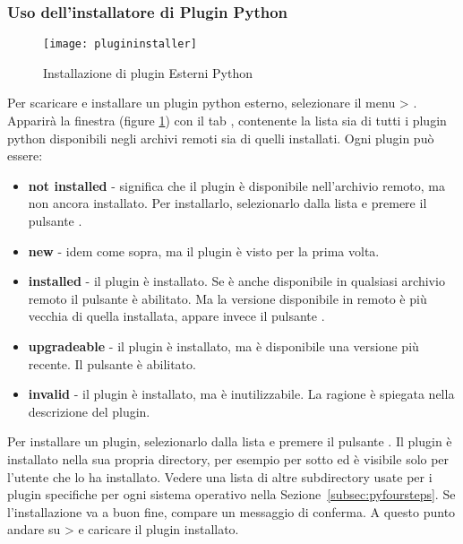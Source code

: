 \subsubsection{Uso dell'installatore di Plugin Python}\label{sec:python_plugin_installer}

\begin{figure}[ht]
   \begin{center}
   \caption{Installazione di plugin Esterni Python \nixcaption}
\label{fig:plugininstaller}\smallskip
   \texttt{[image: plugininstaller]}
\end{center}
\end{figure}

Per scaricare e installare un plugin python esterno, selezionare il menu  > .
Apparirà la finestra   (figure \ref{fig:plugininstaller}) con il tab , contenente la lista sia di tutti i plugin python disponibili negli archivi remoti sia di quelli installati. Ogni plugin può essere:
\begin{itemize}
\item \textbf{not installed} - significa che il plugin è disponibile nell'archivio remoto, ma non ancora installato. Per installarlo, selezionarlo dalla lista e premere il pulsante  .
\item \textbf{new} - idem come sopra, ma il plugin è visto per la prima volta.
\item \textbf{installed} - il plugin è installato. Se è anche disponibile in qualsiasi archivio remoto il pulsante  è abilitato. Ma la versione disponibile in remoto è più vecchia di quella installata, appare invece il pulsante .
\item \textbf{upgradeable} - il plugin è installato, ma è disponibile una versione più recente. Il pulsante  è abilitato.
\item \textbf{invalid} - il plugin è installato, ma è inutilizzabile. La ragione è spiegata nella descrizione del plugin.
\end{itemize}


Per installare un plugin, selezionarlo dalla lista e premere il pulsante  . Il plugin è installato nella sua propria directory, per esempio per \nix sotto  ed è visibile solo per l'utente che lo ha installato. Vedere una lista di altre subdirectory usate per i plugin specifiche per ogni sistema operativo nella Sezione~\ref{subsec:pyfoursteps}. Se l'installazione va a buon fine, compare un messaggio di conferma. A questo punto andare su  >  e caricare il plugin installato.

